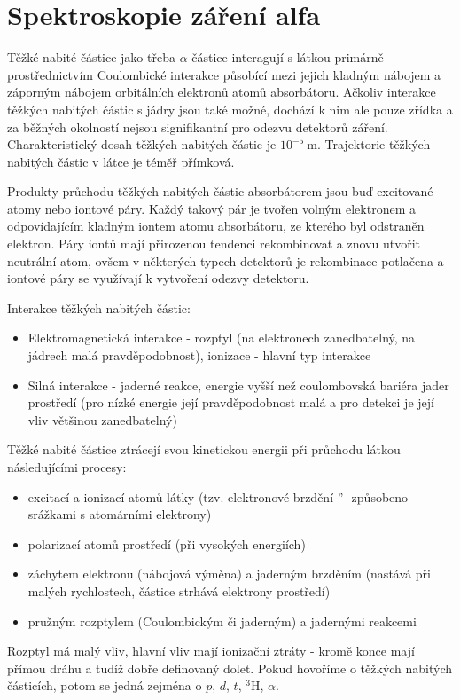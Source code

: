 \documentclass[../../main.tex]{subfiles}
\begin{document}
\chapter{Spektroskopie záření alfa}

Těžké nabité částice jako třeba $\alpha$ částice interagují s látkou primárně prostřednictvím Coulombické interakce působící mezi jejich kladným nábojem a záporným nábojem orbitálních elektronů atomů absorbátoru. Ačkoliv interakce těžkých nabitých částic s jádry jsou také možné, dochází k nim ale pouze zřídka a za běžných okolností nejsou signifikantní pro odezvu detektorů záření. Charakteristický dosah těžkých nabitých částic je $10^{-5} ~\mathrm{m}$. Trajektorie těžkých nabitých částic v látce je téměř přímková.

Produkty průchodu těžkých nabitých částic absorbátorem jsou buď excitované atomy nebo iontové páry. Každý takový pár je tvořen volným elektronem a odpovídajícím kladným iontem atomu absorbátoru, ze kterého byl odstraněn elektron. Páry iontů mají přirozenou tendenci rekombinovat a znovu utvořit neutrální atom, ovšem v některých typech detektorů je rekombinace potlačena a iontové páry se využívají k vytvoření odezvy detektoru. 

Interakce těžkých nabitých částic:
\begin{itemize}
	\item Elektromagnetická interakce - rozptyl (na elektronech zanedbatelný, na jádrech malá pravděpodobnost), ionizace - hlavní typ interakce
	\item Silná interakce - jaderné reakce, energie vyšší než coulombovská bariéra jader prostředí (pro nízké energie její pravděpodobnost malá a pro detekci je její vliv většinou zanedbatelný)
\end{itemize}
Těžké nabité částice ztrácejí svou kinetickou energii při průchodu látkou následujícími procesy:
\begin{itemize}
	\item excitací a ionizací atomů látky (tzv.  \quotedblbase  elektronové brzdění \textquotedblright - způsobeno  srážkami s atomárními elektrony)
	\item polarizací atomů prostředí (při vysokých energiích)
	\item záchytem elektronu (nábojová výměna) a jaderným brzděním (nastává při malých rychlostech, částice strhává elektrony prostředí)
	\item pružným rozptylem (Coulombickým či jaderným) a jadernými reakcemi
\end{itemize}
Rozptyl má malý vliv, hlavní vliv mají ionizační ztráty - kromě konce mají přímou dráhu a tudíž dobře definovaný dolet. Pokud hovoříme o těžkých nabitých částicích, potom se jedná zejména o $p$, $d$, $t$, $^{3}$H, $\alpha$.
\end{document}
